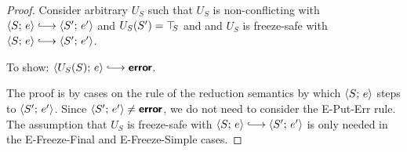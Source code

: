 \begin{proof}
  Consider arbitrary $U_S$ such that $U_S$ is non-conflicting with
  $\config{S}{e} \parstepsto \config{S'}{e'}$ and $U_S(S') = \top\hspace{-0.85mm}_{S}$
  and and $U_S$ is freeze-safe with $\config{S}{e} \parstepsto
  \config{S'}{e'}$.

  To show: $\config{U_S(S)}{e} \parstepsto \error$.

  The proof is by cases on the rule of the reduction semantics by
  which $\langle S;\, e \rangle$ steps to $\langle S';\, e' \rangle$.  Since
  $\langle S';\, e' \rangle \neq \textbf{\textsf{error}}$, we do not need to consider the {\sc
    E-Put-Err} rule.  The assumption that $U_S$ is freeze-safe with
  $\config{S}{e} \parstepsto \config{S'}{e'}$ is only needed in the
  {\sc E-Freeze-Final} and {\sc E-Freeze-Simple} cases.

\end{proof}
